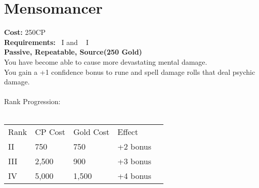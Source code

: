 \section{Mensomancer}\label{perk:mensomancer}
\textbf{Cost:} 250CP\\
\textbf{Requirements:}~ I and ~ I\\
\textbf{Passive, Repeatable, Source(250 Gold)}\\
You have become able to cause more devastating mental damage.\\
You gain a +1 confidence bonus to rune and spell damage rolls that deal psychic damage.\\
\\
Rank Progression:\\
\\
\begin{tabular}{l | l | l | l | l}
    Rank & CP Cost & Gold Cost &  Effect\\
    II & 750 & 750 & +2 bonus\\
    III & 2,500 & 900 & +3 bonus\\
    IV & 5,000 & 1,500 & +4 bonus\\
\end{tabular}